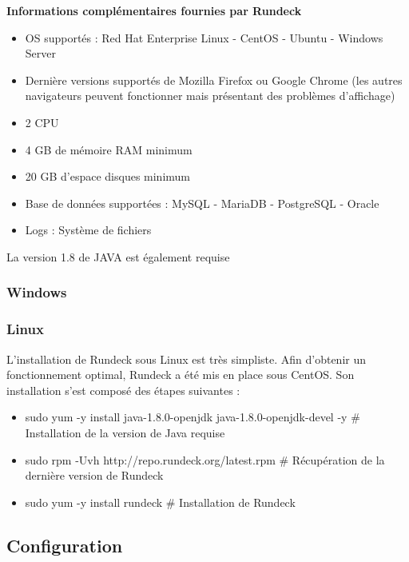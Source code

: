 \documentclass[12pt]{article}
\begin{document}
\textbf{Informations complémentaires fournies par Rundeck}
\begin{itemize}
    \item OS supportés :  Red Hat Enterprise Linux - CentOS - Ubuntu - Windows Server
    \item Dernière versions supportés de Mozilla Firefox ou Google Chrome (les autres navigateurs peuvent fonctionner mais présentant des problèmes d'affichage)
    \item 2 CPU
    \item 4 GB de mémoire RAM minimum
    \item 20 GB d'espace disques minimum
    \item Base de données supportées : MySQL - MariaDB - PostgreSQL - Oracle
    \item Logs : Système de fichiers
\end{itemize}

\vspace{0.5cm}

La version 1.8 de JAVA est également requise
\subsubsection{Windows}

\subsubsection{Linux}

L'installation de Rundeck sous Linux est très simpliste. Afin d'obtenir un fonctionnement optimal, Rundeck a été mis en place sous CentOS. Son installation s'est composé des étapes suivantes : 

\vspace{0.5cm}

\begin{itemize}
    \item sudo yum -y install java-1.8.0-openjdk java-1.8.0-openjdk-devel -y \# Installation de la version de Java requise
    \item sudo rpm -Uvh http://repo.rundeck.org/latest.rpm \# Récupération de la dernière version de Rundeck
    \item sudo yum -y install rundeck \# Installation de Rundeck
\end{itemize}

\subsection{Configuration}
\end{document}

